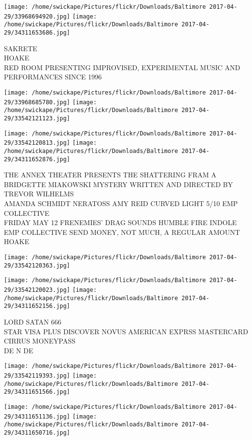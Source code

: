 \documentclass[10pt,letterpaper]{article}
\begin{document}
\vspace{0.25in}
\texttt{[image: /home/swickape/Pictures/flickr/Downloads/Baltimore 2017-04-29/33968694920.jpg]}
\texttt{[image: /home/swickape/Pictures/flickr/Downloads/Baltimore 2017-04-29/34311653686.jpg]}

SAKRETE\\
HOAKE\\
RED ROOM PRESENTING IMPROVISED, EXPERIMENTAL MUSIC AND PERFORMANCES SINCE 1996
\pagebreak

\texttt{[image: /home/swickape/Pictures/flickr/Downloads/Baltimore 2017-04-29/33968685780.jpg]}
\texttt{[image: /home/swickape/Pictures/flickr/Downloads/Baltimore 2017-04-29/33542121123.jpg]}

\texttt{[image: /home/swickape/Pictures/flickr/Downloads/Baltimore 2017-04-29/33542120813.jpg]}
\texttt{[image: /home/swickape/Pictures/flickr/Downloads/Baltimore 2017-04-29/34311652876.jpg]}

THE ANNEX THEATER PRESENTS THE SHATTERING FRAM A BRIDGETTE MIAKOWSKI MYSTERY WRITTEN AND DIRECTED BY TREVOR WILHELMS\\
AMANDA SCHMIDT NERATOSS AMY REID CURVED LIGHT 5/10 EMP COLLECTIVE\\
FRIDAY MAY 12 FRENEMIES' DRAG SOUNDS HUMBLE FIRE INDOLE EMP COLLECTIVE SEND MONEY, NOT MUCH, A REGULAR AMOUNT\\
HOAKE
\pagebreak

\texttt{[image: /home/swickape/Pictures/flickr/Downloads/Baltimore 2017-04-29/33542120363.jpg]}

\vspace{0.25in}
\texttt{[image: /home/swickape/Pictures/flickr/Downloads/Baltimore 2017-04-29/33542120023.jpg]}
\texttt{[image: /home/swickape/Pictures/flickr/Downloads/Baltimore 2017-04-29/34311652156.jpg]}

LORD SATAN 666\\
STAR VISA PLUS DISCOVER NOVUS AMERICAN EXPRSS MASTERCARD CIRRUS MONEYPASS\\
DE N DE
\pagebreak

\texttt{[image: /home/swickape/Pictures/flickr/Downloads/Baltimore 2017-04-29/33542119393.jpg]}
\texttt{[image: /home/swickape/Pictures/flickr/Downloads/Baltimore 2017-04-29/34311651566.jpg]}

\texttt{[image: /home/swickape/Pictures/flickr/Downloads/Baltimore 2017-04-29/34311651136.jpg]}
\texttt{[image: /home/swickape/Pictures/flickr/Downloads/Baltimore 2017-04-29/34311650716.jpg]}
\end{document}
